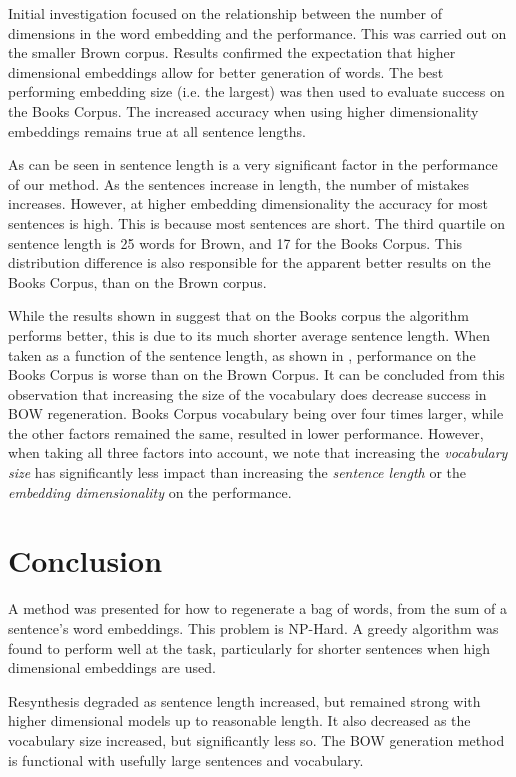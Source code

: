 {Initial investigation focused on the relationship between the number of dimensions in the word embedding and the performance. This was carried out on the smaller Brown corpus. Results confirmed the expectation that higher dimensional embeddings allow for better generation of words. The best performing embedding size (i.e. the largest)  was then used to evaluate success on the Books Corpus. The increased accuracy when using higher dimensionality embeddings remains true at all sentence lengths.

As can be seen in  sentence length is a very significant factor in the performance of our method. As the sentences increase in length, the number of mistakes increases. However, at higher embedding dimensionality the accuracy for most sentences is high. This is because most sentences are short. The third quartile on sentence length is 25 words for Brown, and 17 for the Books Corpus. This distribution difference is also responsible for the apparent better results on the Books Corpus, than on the Brown corpus.

While the results shown in  suggest that on the Books corpus the algorithm performs better, this is due to its much shorter average sentence length. When taken as a function of the sentence length, as shown in ,  performance on the Books Corpus is worse than on the Brown Corpus. It can be concluded from this observation that increasing the size of the vocabulary does decrease success in BOW regeneration. Books Corpus vocabulary being over four times larger, while the other factors remained the same, resulted in lower performance. However, when taking all three factors into account, we note that increasing the \emph{vocabulary size} has significantly less impact than increasing the \emph{sentence length} or the \emph{embedding dimensionality} on the performance.


\section{Conclusion} \label{conclusionBOWgen}
A method was presented for how to regenerate a bag of words, from the sum of a sentence's word embeddings. This problem is NP-Hard. A greedy algorithm was found to perform well at the task, particularly for shorter sentences when high dimensional embeddings are used. 

Resynthesis degraded as sentence length increased, but remained strong with higher dimensional models up to reasonable length. It also decreased as the vocabulary size increased, but significantly less so. The BOW generation method is functional with usefully large sentences and vocabulary.

}
